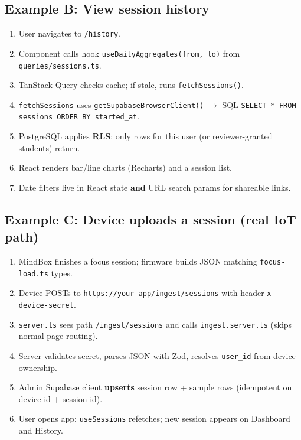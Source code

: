 \documentclass[11pt,a4paper]{article}
\newcommand{\filepath}[1]{\texttt{#1}}
\begin{document}
\subsection{Example B: View session history}

\begin{enumerate}[leftmargin=*]
  \item User navigates to \filepath{/history}.
  \item Component calls hook \texttt{useDailyAggregates(from, to)} from \filepath{queries/sessions.ts}.
  \item TanStack Query checks cache; if stale, runs \texttt{fetchSessions()}.
  \item \texttt{fetchSessions} uses \texttt{getSupabaseBrowserClient()} $\rightarrow$ SQL \texttt{SELECT * FROM sessions ORDER BY started\_at}.
  \item PostgreSQL applies \textbf{RLS}: only rows for this user (or reviewer-granted students) return.
  \item React renders bar/line charts (Recharts) and a session list.
  \item Date filters live in React state \textbf{and} URL search params for shareable links.
\end{enumerate}

\subsection{Example C: Device uploads a session (real IoT path)}

\begin{enumerate}[leftmargin=*]
  \item MindBox finishes a focus session; firmware builds JSON matching \filepath{focus-load.ts} types.
  \item Device POSTs to \filepath{https://your-app/ingest/sessions} with header \texttt{x-device-secret}.
  \item \filepath{server.ts} sees path \filepath{/ingest/sessions} and calls \filepath{ingest.server.ts} (skips normal page routing).
  \item Server validates secret, parses JSON with Zod, resolves \texttt{user\_id} from device ownership.
  \item Admin Supabase client \textbf{upserts} session row + sample rows (idempotent on device id + session id).
  \item User opens app; \texttt{useSessions} refetches; new session appears on Dashboard and History.
\end{enumerate}
\end{document}

